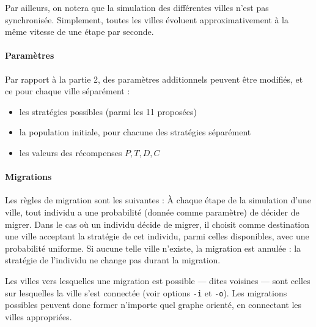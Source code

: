 \documentclass[10pt]{article}
\begin{document}
Par ailleurs, on notera que la simulation des différentes villes n'est pas synchronisée. 
Simplement, toutes les villes évoluent approximativement à la même vitesse de une étape par seconde.

\paragraph{Paramètres}
Par rapport à la partie 2, des paramètres additionnels peuvent être modifiés, et ce pour chaque ville séparément :
\begin{itemize}
\item les stratégies possibles (parmi les 11 proposées)
\item la population initiale, pour chacune des stratégies séparément
\item les valeurs des récompenses $P,T,D,C$
\end{itemize}

\paragraph{Migrations}
Les règles de migration sont les suivantes :
À chaque étape de la simulation d'une ville, tout individu a une probabilité (donnée comme paramètre) de décider de migrer.
Dans le cas où un individu décide de migrer, il choisit comme destination une ville acceptant la stratégie de cet individu, parmi celles disponibles,
avec une probabilité uniforme. Si aucune telle ville n'existe, la migration est annulée : la stratégie de l'individu ne change pas
durant la migration.

Les villes vers lesquelles une migration est possible --- dites voisines --- sont celles sur lesquelles la ville s'est connectée
(voir options \verb|-i| et \verb|-o|). Les migrations possibles peuvent donc former n'importe quel graphe orienté, en connectant
les villes appropriées.



\clearpage
\appendix
\end{document}
